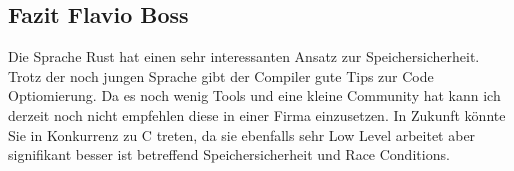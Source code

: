 \subsection{Fazit Flavio Boss}
Die Sprache Rust hat einen sehr interessanten Ansatz zur Speichersicherheit. Trotz der noch jungen Sprache gibt der Compiler gute Tips zur Code Optiomierung. Da es noch wenig Tools und eine kleine Community hat kann ich derzeit noch nicht empfehlen diese in einer Firma einzusetzen. In Zukunft könnte Sie in Konkurrenz zu C treten, da sie ebenfalls sehr Low Level arbeitet aber signifikant besser ist betreffend Speichersicherheit und Race Conditions.